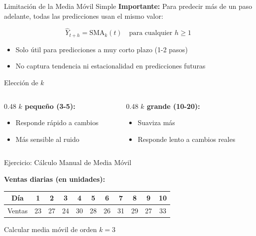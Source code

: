 \documentclass{beamer}
\begin{document}
\begin{frame}{Limitación de la Media Móvil Simple}
    \textbf{Importante:} Para predecir más de un paso adelante, todas las predicciones usan el mismo valor:
    
    \[
    \hat{Y}_{t+h} = \text{SMA}_k(t) \quad \text{para cualquier } h \geq 1
    \]
    
    \vspace{0.5cm}
    
    \begin{itemize}
        \item Solo útil para predicciones a muy corto plazo (1-2 pasos)
        \item No captura tendencia ni estacionalidad en predicciones futuras
    \end{itemize}
\end{frame}

\begin{frame}{Elección de $k$}
    \begin{columns}
        \begin{column}{0.48\textwidth}
            \textbf{$k$ pequeño (3-5):}
            \begin{itemize}
                \item Responde rápido a cambios
                \item Más sensible al ruido
            \end{itemize}
        \end{column}
        \begin{column}{0.48\textwidth}
            \textbf{$k$ grande (10-20):}
            \begin{itemize}
                \item Suaviza más
                \item Responde lento a cambios reales
            \end{itemize}
        \end{column}
    \end{columns}
\end{frame}

\begin{frame}{Ejercicio: Cálculo Manual de Media Móvil}
    \begin{center}
        \textbf{Ventas diarias (en unidades):}
        
        \vspace{0.3cm}
        
        \begin{tabular}{c*{10}{c}}
            \toprule
            Día & 1 & 2 & 3 & 4 & 5 & 6 & 7 & 8 & 9 & 10 \\
            \midrule
            Ventas & 23 & 27 & 24 & 30 & 28 & 26 & 31 & 29 & 27 & 33 \\
            \bottomrule
        \end{tabular}
        
        \vspace{0.5cm}
        
        Calcular media móvil de orden $k=3$
    \end{center}
\end{frame}
\end{document}
